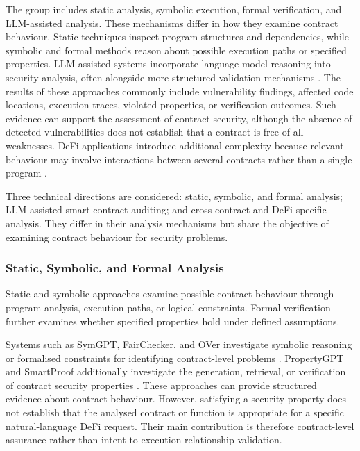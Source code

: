 The group includes static analysis, symbolic execution,
formal verification, and LLM-assisted analysis. These
mechanisms differ in how they examine contract behaviour.
Static techniques inspect program structures and dependencies,
while symbolic and formal methods reason about possible
execution paths or specified properties. LLM-assisted systems
incorporate language-model reasoning into security analysis,
often alongside more structured validation mechanisms
\cite{sunGPTScanDetectingLogic2023,
weiLLMSmartAuditAdvanced2024,
TODO_PropertyGPT}. The results of these approaches commonly include vulnerability
findings, affected code locations, execution traces, violated
properties, or verification outcomes. Such evidence can support
the assessment of contract security, although the absence of
detected vulnerabilities does not establish that a contract is
free of all weaknesses. DeFi applications introduce additional
complexity because relevant behaviour may involve interactions
between several contracts rather than a single program
\cite{TODO_DeFiTail,TODO_DeFiTainter,
TODO_CHAINTRIX}. 

Three technical directions are considered: static, symbolic,
and formal analysis; LLM-assisted smart contract auditing;
and cross-contract and DeFi-specific analysis. They differ
in their analysis mechanisms but share the objective of
examining contract behaviour for security problems.

\subsubsection{Static, Symbolic, and Formal Analysis}

Static and symbolic approaches examine possible contract
behaviour through program analysis, execution paths,
or logical constraints. Formal verification further
examines whether specified properties hold under
defined assumptions.

Systems such as SymGPT, FairChecker, and OVer investigate
symbolic reasoning or formalised constraints for identifying
contract-level problems
\cite{TODO_SymGPT,TODO_FairChecker,TODO_OVer}.
PropertyGPT and SmartProof additionally investigate
the generation, retrieval, or verification of contract
security properties
\cite{TODO_PropertyGPT,TODO_SmartProof}. These approaches can provide structured evidence about
contract behaviour. However, satisfying a security
property does not establish that the analysed contract
or function is appropriate for a specific natural-language
DeFi request. Their main contribution is therefore
contract-level assurance rather than intent-to-execution
relationship validation.


